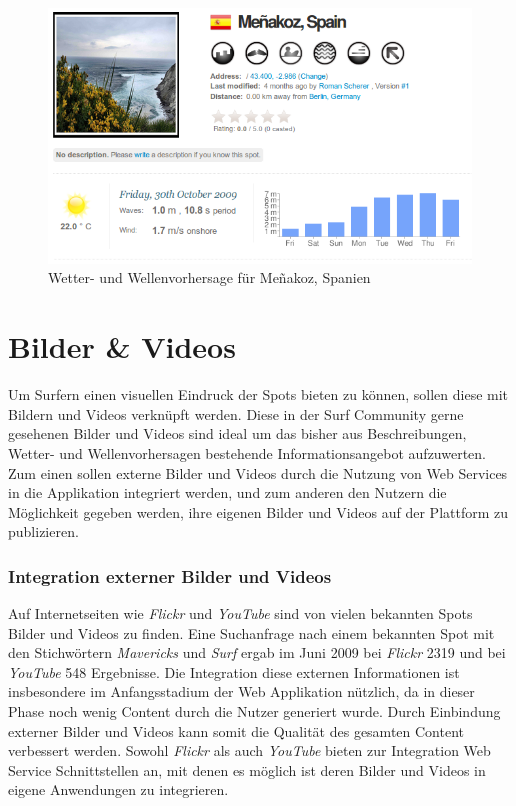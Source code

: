 \begin{figure}[h]
 \includegraphics[width=\textwidth]{bilder/forecast}
 \caption{Wetter- und Wellenvorhersage für Meñakoz, Spanien}
 \label{forecast}
\end{figure}

\section{Bilder \& Videos}
Um Surfern einen visuellen Eindruck der Spots bieten zu können, sollen
diese mit Bildern und Videos verknüpft werden. Diese in der Surf
Community gerne gesehenen Bilder und Videos sind ideal um das bisher
aus Beschreibungen, Wetter- und Wellenvorhersagen bestehende
Informationsangebot aufzuwerten. Zum einen sollen externe Bilder und
Videos durch die Nutzung von Web Services in die Applikation
integriert werden, und zum anderen den Nutzern die Möglichkeit gegeben
werden, ihre eigenen Bilder und Videos auf der Plattform zu
publizieren.

\subsubsection{Integration externer Bilder und Videos}
Auf Internetseiten wie \textit{Flickr} und \textit{YouTube} sind von
vielen bekannten Spots Bilder und Videos zu finden. Eine Suchanfrage
nach einem bekannten Spot mit den Stichwörtern \textit{Mavericks} und
\textit{Surf} ergab im Juni 2009 bei \textit{Flickr} 2319 und bei
\textit{YouTube} 548 Ergebnisse. Die Integration diese externen
Informationen ist insbesondere im Anfangsstadium der Web Applikation
nützlich, da in dieser Phase noch wenig Content durch die Nutzer
generiert wurde. Durch Einbindung externer Bilder und Videos kann
somit die Qualität des gesamten Content verbessert werden. Sowohl
\textit{Flickr} als auch \textit{YouTube} bieten zur Integration Web
Service Schnittstellen an, mit denen es möglich ist deren Bilder und
Videos in eigene Anwendungen zu integrieren.

